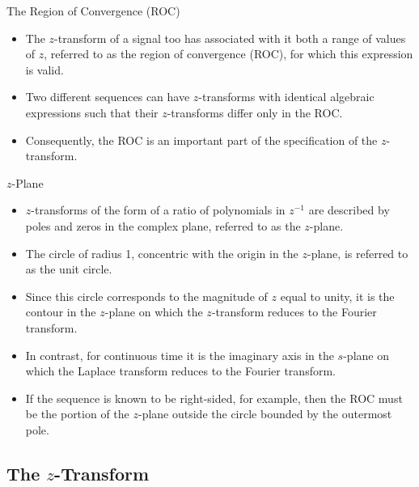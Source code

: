 \begin{frame}{The Region of Convergence (ROC)}
    \begin{itemize}
        \item The $z$-transform of a signal too has associated with it both  a range of values of $z$, referred to as the region of convergence (ROC), for which this expression is valid.
        \item Two different sequences can have $z$-transforms with identical algebraic expressions such that their $z$-transforms differ only in the ROC.
        \item Consequently, the ROC is an important part of the specification of the $z$-transform.
    \end{itemize}
\end{frame}


\begin{frame}{$z$-Plane}
    \begin{itemize}
        \item $z$-transforms of the form of a ratio of polynomials in $z^{-1}$ are described by poles and zeros in the complex plane, referred to as the $z$-plane.
        \item The circle of radius 1, concentric with the origin in the $z$-plane, is  referred to as the \alert{unit circle}.
        \item Since this circle corresponds to the magnitude of $z$ equal to unity, it is the contour in the $z$-plane on which the $z$-transform reduces to the Fourier transform.
        \item In contrast, for continuous time it is the imaginary axis in the $s$-plane on which the Laplace transform reduces to the Fourier transform.
        \item If the sequence is known to be right-sided, for example, then the ROC must be the portion of the $z$-plane outside the circle bounded by the outermost pole.
    \end{itemize}
\end{frame}

\subsection{The $z$-Transform}

